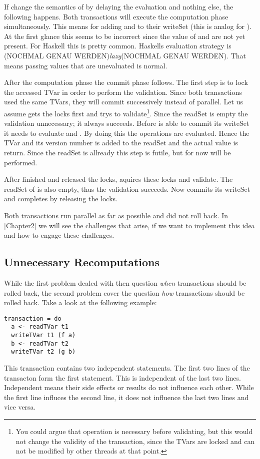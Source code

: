 If change the semantics of  by delaying the evaluation and nothing else, the following happens.
Both transactions will execute the computation phase simultaneously. This means for  adding
 and  to their writeSet (this is analog for ).
At the first glance this seems to be incorrect since the value of  and  are not yet present.
For Haskell this is pretty common. Haskells evaluation strategy is (NOCHMAL GENAU WERDEN)\textit{lazy}(NOCHMAL GENAU WERDEN). 
That means passing values that are unevaluated is normal. 

After the computation phase the commit phase follows. The first step is to lock the accessed TVar in order to 
perform the validation. Since both transactions used the same TVars, they will commit successively instead of
parallel. Let us assume  gets the locks first and trys to validate\footnote{You could argue that 
 operation is necessary before validating, but this would not change the validity of the 
transaction, since the TVars are locked and can not be modified by other threads at that point.}. Since the readSet is empty the
validation unnecessary; it always succeeds. Before  is able to commit its writeSet it needs
to evaluate  and . By doing this the  operations are evaluated. Hence the 
TVar and its version number is added to the readSet and the actual value is return. Since the readSet is allready 
this step is futile, but for now will be performed.

After  finished and released the locks,  aquires these locks
and validate. The readSet of  is also empty, thus the validation succeeds. Now  
commits its writeSet and completes by releasing the locks.

Both transactions run parallel as far as possible and did not roll back. In \ref{Chapter2}
we will see the challenges that arise, if we want to implement this idea and how to engage these challenges.


\subsection{Unnecessary Recomputations}
While the first problem dealed with then question \textit{when} transactions should be rolled back,
the second problem cover the question \textit{how} transactions should be rolled back. Take a look
at the following example:
\begin{lstlisting}
transaction = do 
  a <- readTVar t1	
  writeTVar t1 (f a)	
  b <- readTVar t2	
  writeTVar t2 (g b)	
\end{lstlisting}
This transaction contains two independent statements. The first two lines of the transacton form the first 
statement. This is independent of the last two lines. Independent means their side effects or results do not 
influence each other. While the first line influces the second line, it does not influence the last two lines
and vice versa. 

